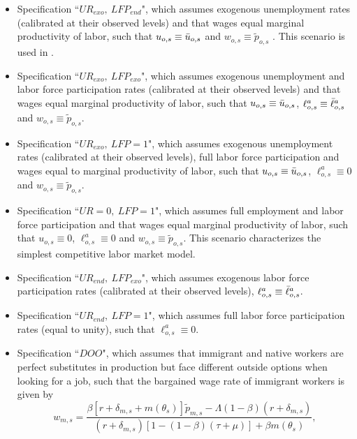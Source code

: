 \documentclass[a4paper,12pt]{article}
\begin{document}
\begin{itemize}
\item Specification ``$UR_{exo},~LFP_{end}$", which assumes exogenous unemployment rates (calibrated at their observed levels) and that wages equal marginal productivity of labor, such that $u_{o,s} \equiv  \Bar{u}_{o,s}$ and  $w_{o,s} \equiv \widetilde{p}_{o,s}$ . This scenario is used in \citet{Burzynski2018}.
\item Specification ``$UR_{exo},~LFP_{exo}$", which assumes exogenous unemployment and labor force participation rates (calibrated at their observed levels) and that wages equal marginal productivity of labor, such that $u_{o,s} \equiv  \Bar{u}_{o,s}$, $\ell^a_{o,s} \equiv \Bar{\ell}^a_{o,s} $ and  $w_{o,s} \equiv \widetilde{p}_{o,s}$.
\item Specification ``$UR_{exo},~LFP=1$", which assumes exogenous unemployment rates (calibrated at their observed levels), full labor force participation and wages equal to marginal productivity of labor, such that $u_{o,s} \equiv  \Bar{u}_{o,s}$, $\ell^a_{o,s} \equiv 0 $ and  $w_{o,s} \equiv \widetilde{p}_{o,s}$.
\item Specification ``$UR=0,~LFP=1$", which assumes full employment and labor force participation and that wages equal marginal productivity of labor, such that $u_{o,s} \equiv  0$, $\ell^a_{o,s} \equiv 0 $ and  $w_{o,s} \equiv \widetilde{p}_{o,s}$. This scenario characterizes the simplest competitive labor market model.
\item Specification ``$UR_{end},~LFP_{exo}$", which assumes exogenous labor force participation rates (calibrated at their observed levels), $\ell^a_{o,s} \equiv \Bar{\ell}^a_{o,s} $.
\item Specification ``$UR_{end},~LFP=1$", which assumes full labor force participation rates (equal to unity), such that $\ell^a_{o,s} \equiv 0 $. %
\item Specification ``$DOO$", which assumes that immigrant and native workers are perfect substitutes in production but face different outside options when looking for a job, such that the bargained wage rate of immigrant workers is given by
\begin{equation*}
  w_{m,s}=\frac{\beta \left[ r+\delta _{m,s}+m\left( \theta _{s}\right) \right]
\widetilde{p}_{m,s}-\Lambda \left(1-\beta\right)\left( r+\delta _{m,s} \right)}{\left( r+\delta _{m,s}\right) \left[ 1-\left( 1-\beta \right)
\left( \tau +\mu \right) \right] +\beta m\left( \theta _{s}\right) },
\end{equation*}

\end{itemize}
\end{document}

